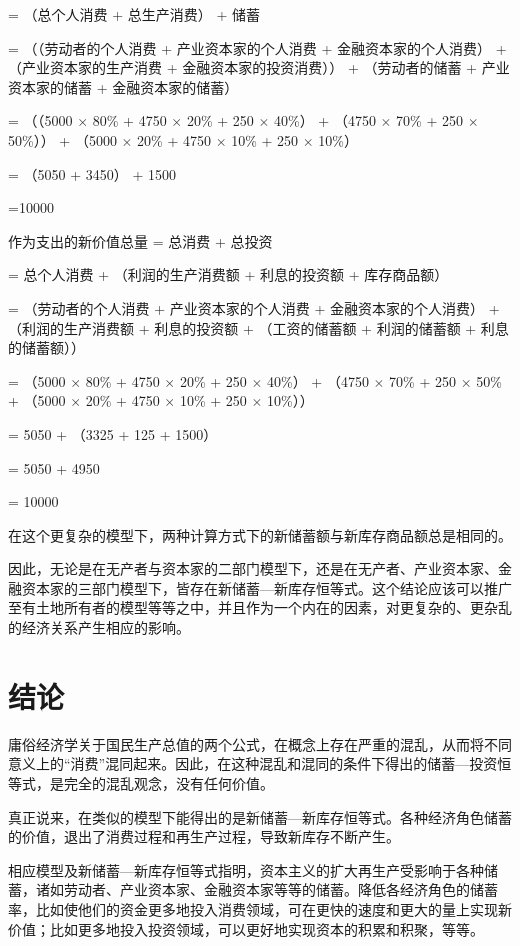 \documentclass[a4paper]{ctexart}
\begin{document}
= （总个人消费 + 总生产消费） + 储蓄

= （（劳动者的个人消费 + 产业资本家的个人消费 + 金融资本家的个人消费） + （产业资本家的生产消费 + 金融资本家的投资消费）） + （劳动者的储蓄 + 产业资本家的储蓄 + 金融资本家的储蓄）

= （（5000 $\times$ 80\% + 4750 $\times$ 20\% + 250 $\times$ 40\%） + （4750 $\times$ 70\% + 250 $\times$ 50\%）） + （5000 $\times$ 20\% + 4750 $\times$ 10\% + 250 $\times$ 10\%）

= （5050 + 3450） + 1500

=10000

作为支出的新价值总量 = 总消费 + 总投资

= 总个人消费 + （利润的生产消费额 + 利息的投资额 + 库存商品额）

= （劳动者的个人消费 + 产业资本家的个人消费 + 金融资本家的个人消费） + （利润的生产消费额 + 利息的投资额 + （工资的储蓄额 + 利润的储蓄额 + 利息的储蓄额））

= （5000 $\times$ 80\% + 4750 $\times$ 20\% + 250 $\times$ 40\%） + （4750 $\times$ 70\% + 250 $\times$ 50\% + （5000 $\times$ 20\% + 4750 $\times$ 10\% + 250 $\times$ 10\%））

= 5050 + （3325 + 125 + 1500）

= 5050 + 4950

= 10000

在这个更复杂的模型下，两种计算方式下的新储蓄额与新库存商品额总是相同的。

因此，无论是在无产者与资本家的二部门模型下，还是在无产者、产业资本家、金融资本家的三部门模型下，皆存在新储蓄—新库存恒等式。这个结论应该可以推广至有土地所有者的模型等等之中，并且作为一个内在的因素，对更复杂的、更杂乱的经济关系产生相应的影响。

\section{结论}

庸俗经济学关于国民生产总值的两个公式，在概念上存在严重的混乱，从而将不同意义上的“消费”混同起来。因此，在这种混乱和混同的条件下得出的储蓄—投资恒等式，是完全的混乱观念，没有任何价值。

真正说来，在类似的模型下能得出的是新储蓄—新库存恒等式。各种经济角色储蓄的价值，退出了消费过程和再生产过程，导致新库存不断产生。

相应模型及新储蓄—新库存恒等式指明，资本主义的扩大再生产受影响于各种储蓄，诸如劳动者、产业资本家、金融资本家等等的储蓄。降低各经济角色的储蓄率，比如使他们的资金更多地投入消费领域，可在更快的速度和更大的量上实现新价值；比如更多地投入投资领域，可以更好地实现资本的积累和积聚，等等。
\end{document}
